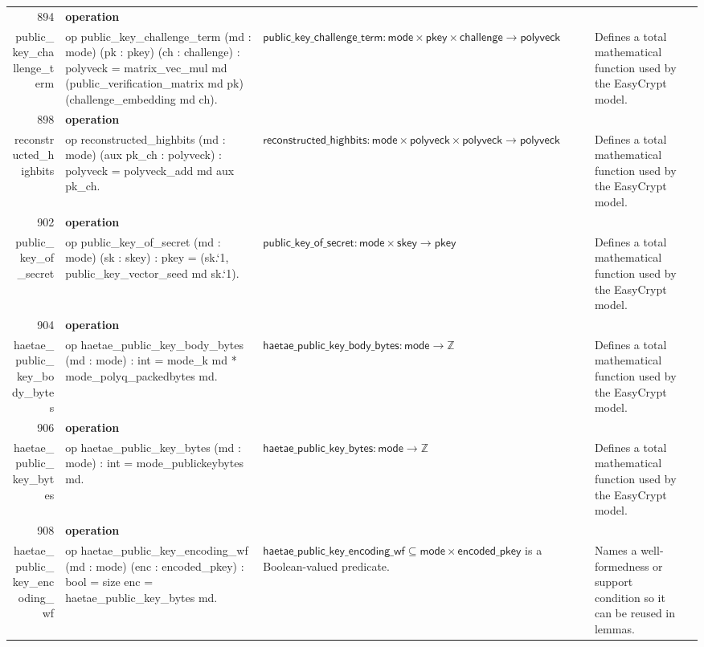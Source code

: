 \documentclass[10pt]{article}
\newcommand{\ec}[1]{\begingroup\ttfamily\scriptsize #1\endgroup}
\begin{document}
\begin{longtable}{r L{0.17\textwidth} L{0.26\textwidth} L{0.27\textwidth} L{0.20\textwidth}}
894 & \textbf{operation}\\\ec{public\_key\_challenge\_term} & \ec{op public\_key\_challenge\_term (md : mode) (pk : pkey) (ch : challenge) : polyveck = matrix\_vec\_mul md (public\_verification\_matrix md pk) (challenge\_embedding md ch).} & \(\mathsf{public\_key\_challenge\_term} : \mathsf{mode} \times \mathsf{pkey} \times \mathsf{challenge} \to \mathsf{polyveck}\) & Defines a total mathematical function used by the EasyCrypt model. \\
898 & \textbf{operation}\\\ec{reconstructed\_highbits} & \ec{op reconstructed\_highbits (md : mode) (aux pk\_ch : polyveck) : polyveck = polyveck\_add md aux pk\_ch.} & \(\mathsf{reconstructed\_highbits} : \mathsf{mode} \times \mathsf{polyveck} \times \mathsf{polyveck} \to \mathsf{polyveck}\) & Defines a total mathematical function used by the EasyCrypt model. \\
902 & \textbf{operation}\\\ec{public\_key\_of\_secret} & \ec{op public\_key\_of\_secret (md : mode) (sk : skey) : pkey = (sk.`1, public\_key\_vector\_seed md sk.`1).} & \(\mathsf{public\_key\_of\_secret} : \mathsf{mode} \times \mathsf{skey} \to \mathsf{pkey}\) & Defines a total mathematical function used by the EasyCrypt model. \\
904 & \textbf{operation}\\\ec{haetae\_public\_key\_body\_bytes} & \ec{op haetae\_public\_key\_body\_bytes (md : mode) : int = mode\_k md * mode\_polyq\_packedbytes md.} & \(\mathsf{haetae\_public\_key\_body\_bytes} : \mathsf{mode} \to \mathbb{Z}\) & Defines a total mathematical function used by the EasyCrypt model. \\
906 & \textbf{operation}\\\ec{haetae\_public\_key\_bytes} & \ec{op haetae\_public\_key\_bytes (md : mode) : int = mode\_publickeybytes md.} & \(\mathsf{haetae\_public\_key\_bytes} : \mathsf{mode} \to \mathbb{Z}\) & Defines a total mathematical function used by the EasyCrypt model. \\
908 & \textbf{operation}\\\ec{haetae\_public\_key\_encoding\_wf} & \ec{op haetae\_public\_key\_encoding\_wf (md : mode) (enc : encoded\_pkey) : bool = size enc = haetae\_public\_key\_bytes md.} & \(\mathsf{haetae\_public\_key\_encoding\_wf} \subseteq \mathsf{mode} \times \mathsf{encoded\_pkey}\) is a Boolean-valued predicate. & Names a well-formedness or support condition so it can be reused in lemmas. \\

\end{longtable}
\end{document}
